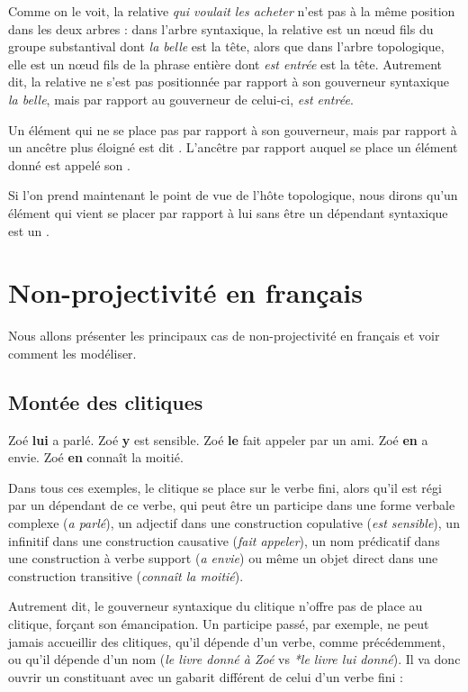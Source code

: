Comme on le voit, la relative \textit{qui voulait les acheter} n’est pas à la même position dans les deux arbres : dans l’arbre syntaxique, la relative est un nœud fils du groupe substantival dont \textit{la belle} est la tête, alors que dans l’arbre topologique, elle est un nœud fils de la phrase entière dont \textit{est entrée} est la tête. Autrement dit, la relative ne s’est pas positionnée par rapport à son gouverneur syntaxique \textit{la belle}, mais par rapport au gouverneur de celui-ci, \textit{est entrée}.

{Un élément qui ne se place pas par rapport à son gouverneur, mais par rapport à un ancêtre plus éloigné est dit . L’ancêtre par rapport auquel se place un élément donné est appelé son .}

Si l’on prend maintenant le point de vue de l’hôte topologique, nous dirons qu’un élément qui vient se placer par rapport à lui sans être un dépendant syntaxique est un .

\section{Non-projectivité en français}\label{sec:3.5.32}

Nous allons présenter les principaux cas de non-projectivité en français et voir comment les modéliser.

\subsection{Montée des clitiques}
\ea
\ea
{Zoé} \textbf{{lui}}  {a parlé.}
\ex
 {Zoé} \textbf{{y}}  {est sensible.}
\ex
 {Zoé} \textbf{{le}}  {fait appeler par un ami.}
\ex
 {Zoé} \textbf{{en}}  {a envie.}
\ex
 {Zoé} \textbf{{en}}  {connaît la moitié.}
\z
\z

Dans tous ces exemples, le clitique se place sur le verbe fini, alors qu’il est régi par un dépendant de ce verbe, qui peut être un participe dans une forme verbale complexe (\textit{a parlé}), un adjectif dans une construction copulative (\textit{est sensible}), un infinitif dans une construction causative (\textit{fait appeler}), un nom prédicatif dans une construction à verbe support (\textit{a envie}) ou même un objet direct dans une construction transitive (\textit{connaît la moitié}).

Autrement dit, le gouverneur syntaxique du clitique n’offre pas de place au clitique, forçant son émancipation. Un participe passé, par exemple, ne peut jamais accueillir des clitiques, qu’il dépende d’un verbe, comme précédemment, ou qu’il dépende d’un nom (\textit{le livre donné à Zoé} vs \textit{*le livre lui donné}). Il va donc ouvrir un constituant avec un gabarit différent de celui d’un verbe fini :

